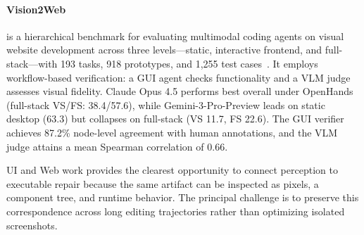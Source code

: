 \paragraph{Vision2Web}
 is a hierarchical benchmark for evaluating multimodal coding agents on visual website development across three levels—static, interactive frontend, and full-stack—with 193 tasks, 918 prototypes, and 1,255 test cases~\cite{avg260326648}. It employs workflow-based verification: a GUI agent checks functionality and a VLM judge assesses visual fidelity. Claude Opus 4.5 performs best overall under OpenHands (full-stack VS/FS: 38.4/57.6), while Gemini-3-Pro-Preview leads on static desktop (63.3) but collapses on full-stack (VS 11.7, FS 22.6). The GUI verifier achieves 87.2\% node-level agreement with human annotations, and the VLM judge attains a mean Spearman correlation of 0.66.

UI and Web work provides the clearest opportunity to connect perception to executable repair because the same artifact can be inspected as pixels, a component tree, and runtime behavior. The principal challenge is to preserve this correspondence across long editing trajectories rather than optimizing isolated screenshots.

\FloatBarrier

\Needspace{0.80\textheight}
